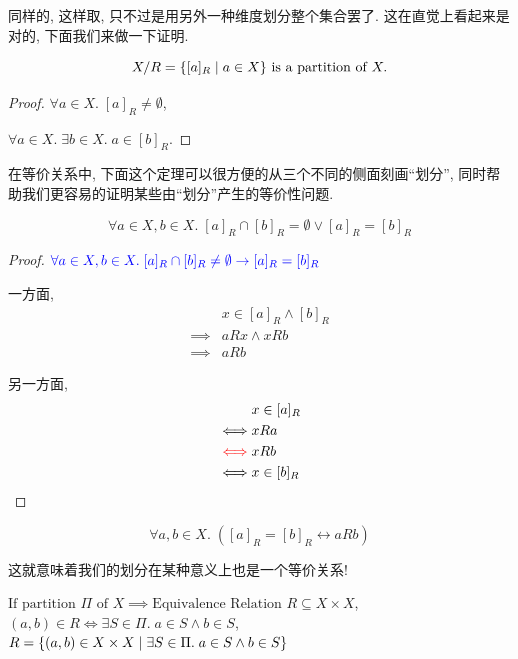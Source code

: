 同样的, 这样取, 只不过是用另外一种维度划分整个集合罢了. 这在直觉上看起来是对的, 下面我们来做一下证明. 

\begin{theorem}
  \[
    X/R = \{[a]_{R} \mid a \in X\} \text{ is a partition of } X.
  \]
\end{theorem}

\begin{proof}
  $\forall a \in X.\; [a]_{R} \neq \emptyset$, 

  $\forall a \in X.\; \exists b \in X.\; a \in [b]_{R}$.
\end{proof}

在等价关系中, 下面这个定理可以很方便的从三个不同的侧面刻画``划分'', 同时帮助我们更容易的证明某些由``划分''产生的等价性问题. 

\begin{theorem}
  \[
      \forall a \in X, b \in X.\; [a]_{R} \cap [b]_{R} = \emptyset \lor [a]_{R} = [b]_{R}
  \]
\end{theorem}

\begin{proof}
  $\textcolor{blue}{\forall a \in X, b \in X.\; [a]_{R} \cap [b]_{R} \neq \emptyset \to [a]_{R} = [b]_{R}}$

  一方面, 
      \setcounter{equation}{0}
      \begin{align*}
        &x \in [a]_{R} \land [b]_{R} \\
        \implies& aRx \land xRb \\
        \implies& aRb
      \end{align*}

  另一方面, 
      \setcounter{equation}{0}
      \begin{align*}
        &x \in [a]_{R} \\
        \iff& x R a \\
        \textcolor{red}{\iff}& x R b \\
        \iff& x \in [b]_{R}
      \end{align*}
\end{proof}


\begin{theorem}
  \[
    \forall a, b \in X.\; ([a]_{R} = [b]_{R} \leftrightarrow a R b)
  \]
\end{theorem}

这就意味着我们的划分在某种意义上也是一个等价关系! 

\begin{definition}
  $\text{If partition } \Pi \text{ of } X \implies \text{Equivalence Relation } R \subseteq X \times X$, $(a, b) \in R \iff \exists S \in \Pi.\; a \in S \land b \in S$, $R = \{(a, b) \in X \times X \mid \exists S \in \Pi.\; a \in S \land b \in S\}$
\end{definition}

